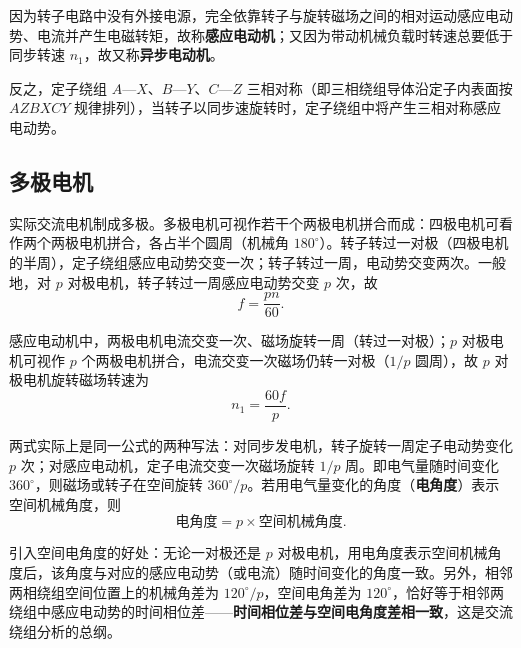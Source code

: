 因为转子电路中没有外接电源，完全依靠转子与旋转磁场之间的相对运动感应电动势、电流并产生电磁转矩，故称\textbf{感应电动机}；又因为带动机械负载时转速总要低于同步转速 $n_1$，故又称\textbf{异步电动机}。

反之，定子绕组 $A$—$X$、$B$—$Y$、$C$—$Z$ 三相对称（即三相绕组导体沿定子内表面按 $AZBXCY$ 规律排列），当转子以同步速旋转时，定子绕组中将产生三相对称感应电动势。

\subsection{多极电机}
实际交流电机制成多极。多极电机可视作若干个两极电机拼合而成：四极电机可看作两个两极电机拼合，各占半个圆周（机械角 $180^\circ$）。转子转过一对极（四极电机的半周），定子绕组感应电动势交变一次；转子转过一周，电动势交变两次。一般地，对 $p$ 对极电机，转子转过一周感应电动势交变 $p$ 次，故
\begin{equation}
f=\frac{pn}{60}.
\end{equation}

感应电动机中，两极电机电流交变一次、磁场旋转一周（转过一对极）；$p$ 对极电机可视作 $p$ 个两极电机拼合，电流交变一次磁场仍转一对极（$1/p$ 圆周），故 $p$ 对极电机旋转磁场转速为
\begin{equation}
n_1=\frac{60f}{p}.
\end{equation}


两式实际上是同一公式的两种写法：对同步发电机，转子旋转一周定子电动势变化 $p$ 次；对感应电动机，定子电流交变一次磁场旋转 $1/p$ 周。即电气量随时间变化 $360^\circ$，则磁场或转子在空间旋转 $360^\circ/p$。若用电气量变化的角度（\textbf{电角度}）表示空间机械角度，则
\begin{equation}
\text{电角度}=p\times\text{空间机械角度} .
\end{equation}

引入空间电角度的好处：无论一对极还是 $p$ 对极电机，用电角度表示空间机械角度后，该角度与对应的感应电动势（或电流）随时间变化的角度一致。另外，相邻两相绕组空间位置上的机械角差为 $120^\circ/p$，空间电角差为 $120^\circ$，恰好等于相邻两绕组中感应电动势的时间相位差——\textbf{时间相位差与空间电角度差相一致}，这是交流绕组分析的总纲。


